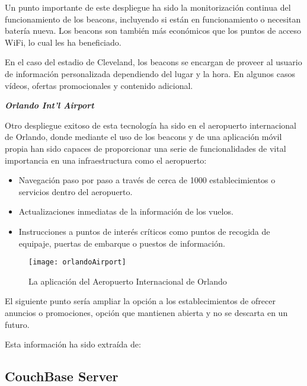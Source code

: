 Un punto importante de este  despliegue ha sido la monitorización continua del funcionamiento de los beacons, incluyendo si están en funcionamiento o necesitan batería nueva. Los beacons son también más económicos que los puntos de acceso WiFi, lo cual les ha beneficiado.

En el caso del estadio de Cleveland, los beacons se encargan de proveer al usuario de información personalizada dependiendo del lugar y la hora. En algunos casos vídeos, ofertas promocionales y contenido adicional.

\vspace{5mm}

\textsl{\textbf{{Orlando Int'l Airport}}}

\vspace{2mm}

Otro despliegue exitoso de esta tecnología ha sido en el aeropuerto internacional de Orlando, donde mediante el uso de los beacons y de una aplicación móvil propia han sido capaces de proporcionar una serie de funcionalidades de vital importancia en una infraestructura como el aeropuerto: 

\begin{itemize}
\item Navegación paso por paso a través de cerca de 1000 establecimientos o servicios dentro del aeropuerto. 
\item Actualizaciones inmediatas de la información de los vuelos. 
\item Instrucciones a puntos de interés críticos como puntos de recogida de equipaje, puertas de embarque o puestos de información.
\end{itemize}

\begin{figure}[H]
	\centering
	\texttt{[image: orlandoAirport]}
	\caption{La aplicación del Aeropuerto Internacional de Orlando}
	\label{fig:orlandoAirport}
\end{figure}

El siguiente punto sería ampliar la opción a los establecimientos de ofrecer anuncios o promociones, opción que mantienen abierta y no se descarta en un futuro.


Esta información ha sido extraída de: \cite{URL::Articulo} 

\subsection{CouchBase Server}

